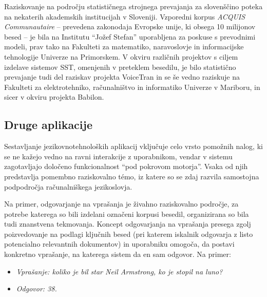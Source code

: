\begin{multicols}{2}

Raziskovanje na področju statističnega strojnega prevajanja za slovenščino poteka na nekaterih akademskih institucijah v Sloveniji. Vzporedni korpus \textit{ACQUIS Communautaire} \cite{ET1} – prevedena zakonodaja Evropske unije, ki obsega 10 milijonov besed – je bila na Institutu “Jožef Stefan” uporabljena za poskuse s prevodnimi modeli, prav tako na Fakulteti za matematiko, naravoslovje in informacijske tehnologije Univerze na Primorskem. V okviru različnih projektov s ciljem izdelave sistemov SST, omenjenih v preteklem besedilu, je bilo statistično prevajanje tudi del raziskav projekta VoiceTran in se še vedno raziskuje na Fakulteti za elektrotehniko, računalništvo in informatiko Univerze v Mariboru, in sicer v okviru projekta Babilon.

\subsection{Druge aplikacije}

Sestavljanje jezikovnotehnoloških aplikacij vključuje celo vrsto pomožnih nalog, ki se ne kažejo vedno na ravni interakcije z uporabnikom, vendar v sistemu zagotavljajo določeno funkcionalnost “pod pokrovom motorja”. Vsaka od njih predstavlja pomembno raziskovalno témo, iz katere so se zdaj razvila samostojna podpodročja računalniškega jezikoslovja.


Na primer, odgovarjanje na vprašanja je živahno raziskovalno področje, za potrebe katerega so bili izdelani označeni korpusi besedil, organizirana so bila tudi znanstvena tekmovanja. Koncept odgovarjanja na vprašanja presega zgolj poizvedovanje na podlagi ključnih besed (pri katerem iskalnik odgovarja z listo potencialno relevantnih dokumentov) in uporabniku omogoča, da postavi konkretno vprašanje, na katerega sistem da en sam odgovor. Na primer:
\begin{itemize}
\item[]\textit{Vprašanje: koliko je bil star Neil Armstrong, ko je stopil na luno?}
\item[]\textit{Odgovor: 38.}
\end{itemize}


\end{multicols}

